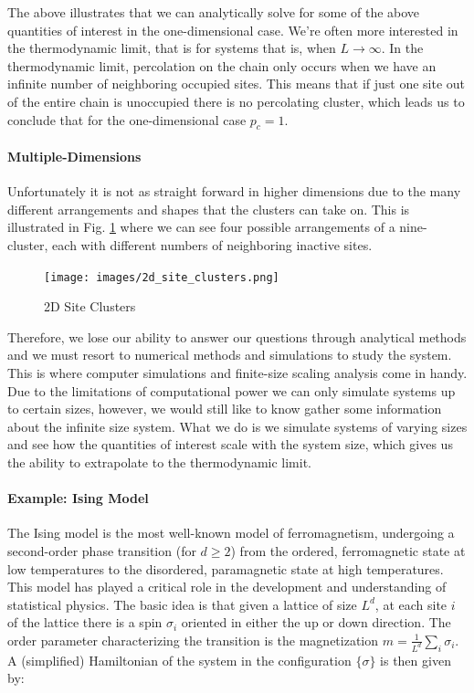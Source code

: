 The above illustrates that we can analytically solve for some of the above quantities of interest in the one-dimensional case.
We're often more interested in the thermodynamic limit, that is for systems that is, when $L \rightarrow \infty$.
In the thermodynamic limit, percolation on the chain only occurs when we have an infinite number of neighboring occupied sites.
This means that if just one site out of the entire chain is unoccupied there is no percolating cluster, which leads us to conclude that for the one-dimensional case $p_c = 1$.

\paragraph{Multiple-Dimensions}
Unfortunately it is not as straight forward in higher dimensions due to the many different arrangements and shapes that the clusters can take on.
This is illustrated in Fig. \ref{fig:2d_site_clusters} where we can see four possible arrangements of a nine-cluster, each with different numbers of neighboring inactive sites.

\begin{figure}[H]
	\centering
	\texttt{[image: images/2d\_site\_clusters.png]}
	\caption{2D Site Clusters}
	\label{fig:2d_site_clusters}
\end{figure}

Therefore, we lose our ability to answer our questions through analytical methods and we must resort to numerical methods and simulations to study the system.
This is where computer simulations and finite-size scaling analysis come in handy.
Due to the limitations of computational power we can only simulate systems up to certain sizes, however, we would still like to know gather some information about the infinite size system.
What we do is we simulate systems of varying sizes and see how the quantities of interest scale with the system size, which gives us the ability to extrapolate to the thermodynamic limit.

\paragraph{Example: Ising Model}
The Ising model is the most well-known model of ferromagnetism, undergoing a second-order phase transition (for $d \ge 2$) from the ordered, ferromagnetic state at low temperatures to the disordered, paramagnetic state at high temperatures.
This model has played a critical role in the development and understanding of statistical physics.
The basic idea is that given a lattice of size $L^d$, at each site $i$ of the lattice there is a spin $\sigma_i$ oriented in either the up or down direction.
The order parameter characterizing the transition is the magnetization $m = \frac{1}{L^d} \sum_i \sigma_i$.
A (simplified) Hamiltonian of the system in the configuration $\{\sigma\}$ is then given by:

